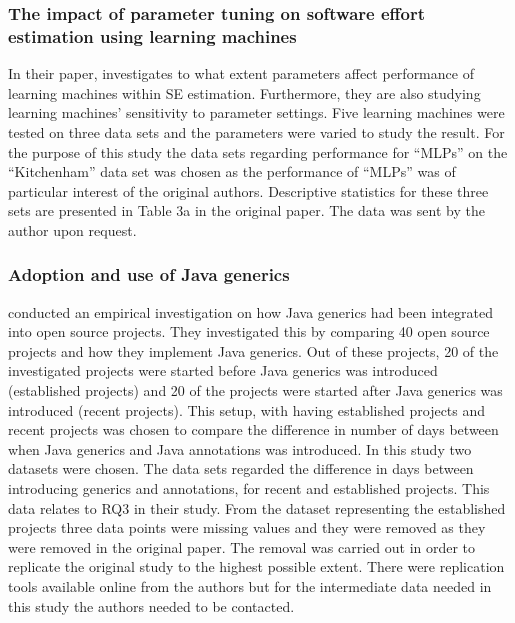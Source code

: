 \subsubsection{The impact of parameter tuning on software effort estimation using learning machines}
\label{sec:resultsprestudy-song2013impact}
In their paper, \citet{song2013impact} investigates to what extent parameters affect performance of learning machines within SE estimation. Furthermore, they are also studying learning machines' sensitivity to parameter settings. Five learning machines were tested on three data sets and the parameters were varied to study the result. For the purpose of this study the data sets regarding performance for ``MLPs'' on the ``Kitchenham'' data set was chosen as the performance of ``MLPs'' was of particular interest of the original authors. Descriptive statistics for these three sets are presented in Table 3a in the original paper. The data was sent by the author upon request.




\subsubsection{Adoption and use of Java generics}
\citet{parnin2013adoption} conducted an empirical investigation on how Java generics had been integrated into open source projects. They investigated this by comparing 40 open source projects and how they implement Java generics. Out of these projects, 20 of the investigated projects were started before Java generics was introduced (established projects) and 20 of the projects were started after Java generics was introduced (recent projects). This setup, with having established projects and recent projects was chosen to compare the difference in number of days between when Java generics and Java annotations was introduced. In this study two datasets were chosen. The data sets regarded the difference in days between introducing generics and annotations, for recent and established projects. This data relates to RQ3 in their study. From the dataset representing the established projects three data points were missing values and they were removed as they were removed in the original paper. The removal was carried out in order to replicate the original study to the highest possible extent. There were replication tools available online from the authors but for the intermediate data needed in this study the authors needed to be contacted.





